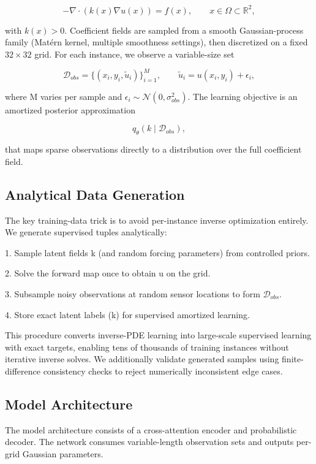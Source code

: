 \documentclass{article}
\begin{document}
\begin{equation}
-\nabla \cdot \left(k(x)\nabla u(x)\right) = f(x), \qquad x \in \Omega \subset \mathbb{R}^2,
\end{equation}

with $k(x) > 0$. Coefficient fields are sampled from a smooth Gaussian-process family (Mat\'ern kernel, multiple smoothness settings), then discretized on a fixed $32 \times 32$ grid.
For each instance, we observe a variable-size set

\begin{equation}
\mathcal{D}_{obs} = \{(x_i, y_i, \tilde{u}_i)\}_{i=1}^{M}, \qquad \tilde{u}_i = u(x_i, y_i) + \epsilon_i,
\end{equation}

where M varies per sample and $\epsilon_i \sim \mathcal{N}(0,\sigma_{obs}^2)$. The learning objective is an amortized posterior approximation

\begin{equation}
q_\theta(k \mid \mathcal{D}_{obs}),
\end{equation}

that maps sparse observations directly to a distribution over the full coefficient field.

\subsection{Analytical Data Generation}
The key training-data trick is to avoid per-instance inverse optimization entirely. We generate supervised tuples analytically:

1. Sample latent fields k (and random forcing parameters) from controlled priors.

2. Solve the forward map once to obtain u on the grid.

3. Subsample noisy observations at random sensor locations to form $\mathcal{D}_{obs}$.

4. Store exact latent labels (k) for supervised amortized learning.

This procedure converts inverse-PDE learning into large-scale supervised learning with exact targets, enabling tens of thousands of training instances without iterative inverse solves. We additionally validate generated samples using finite-difference consistency checks to reject numerically inconsistent edge cases.

\subsection{Model Architecture}
The model architecture consists of a cross-attention encoder and probabilistic decoder. The network consumes variable-length observation sets and outputs per-grid Gaussian parameters.
\end{document}

